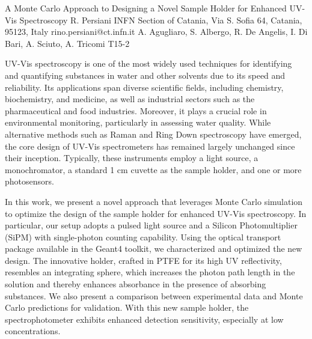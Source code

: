 \begin{talk}
  {A Monte Carlo Approach to Designing a Novel Sample Holder for Enhanced UV-Vis Spectroscopy}%
  {R. Persiani}%
  {INFN Section of Catania, Via S. Sofia 64, Catania, 95123, Italy}%
  {rino.persiani@ct.infn.it}%
  {A. Agugliaro, S. Albergo, R. De Angelis, I. Di Bari, A. Sciuto, A. Tricomi}%
  {T15-2}%
			
UV-Vis spectroscopy is one of the most widely used techniques for identifying and quantifying substances in water and other solvents due to its speed and reliability. Its applications span diverse scientific fields, including chemistry, biochemistry, and medicine, as well as industrial sectors such as the pharmaceutical and food industries. Moreover, it plays a crucial role in environmental monitoring, particularly in assessing water quality. While alternative methods such as Raman and Ring Down spectroscopy have emerged, the core design of UV-Vis spectrometers has remained largely unchanged since their inception. Typically, these instruments employ a light source, a monochromator, a standard 1 cm cuvette as the sample holder, and one or more photosensors.

In this work, we present a novel approach that leverages Monte Carlo simulation to optimize the design of the sample holder for enhanced UV-Vis spectroscopy. In particular, our setup adopts a pulsed light source and a Silicon Photomultiplier (SiPM) with single-photon counting capability. Using the optical transport package available in the Geant4 toolkit, we characterized and optimized the new design. The innovative holder, crafted in PTFE for its high UV reflectivity, resembles an integrating sphere, which increases the photon path length in the solution and thereby enhances absorbance in the presence of absorbing substances. We also present a comparison between experimental data and Monte Carlo predictions for validation. With this new sample holder, the spectrophotometer exhibits enhanced detection sensitivity, especially at low concentrations.

\medskip

\end{talk}

